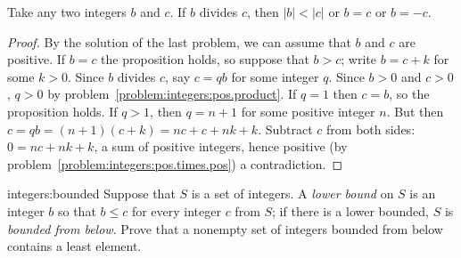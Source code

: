 \begin{proposition}\label{proposition:divisors.smaller}
Take any two integers \(b\) and \(c\).
If \(b\) divides \(c\), then \(|b| < |c|\) or \(b=c\) or \(b=-c\).
\end{proposition}
\begin{proof}
By the solution of the last problem, we can assume that \(b\) and \(c\) are positive.
If \(b=c\) the proposition holds, so suppose that \(b>c\); write \(b=c+k\) for some \(k>0\).
Since \(b\) divides \(c\), say \(c=qb\) for some integer \(q\).
Since \(b>0\) and \(c>0\), \(q>0\) by problem~\vref{problem:integers:pos.product}.
If \(q=1\) then \(c=b\), so the proposition holds.
If \(q>1\), then \(q=n+1\) for some positive integer \(n\).
But then \(c=qb=(n+1)(c+k)=nc+c+nk+k\).
Subtract \(c\) from both sides: \(0=nc+nk+k\), a sum of positive integers, hence positive (by problem~\vref{problem:integers:pos.times.pos}) a contradiction.
\end{proof}

\begin{problem}{integers:bounded}
Suppose that \(S\) is a set of integers.
A \emph{lower bound} on \(S\) is an integer \(b\) so that \(b\le c\) for every integer \(c\) from \(S\); if there is a lower bounded, \(S\) is \emph{bounded from below}.
Prove that a nonempty set of integers bounded from below contains a least element.
\end{problem}

